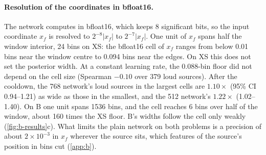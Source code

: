 \paragraph{Resolution of the coordinates in bfloat16.}
The network computes in bfloat16, which keeps 8 significant bits, so the input coordinate
$x_f$ is resolved to $2^{-8}|x_f|$ to $2^{-7}|x_f|$. One unit of $x_f$ spans half the window
interior, 24 bins on XS: the bfloat16 cell of $x_f$ ranges from below 0.01 bins near the
window centre to 0.094 bins near the edges. On XS this does not set the posterior width. At a
constant learning rate, the 0.088-bin floor did not depend on the cell size (Spearman
$-0.10$ over 379 loud sources). After the cooldown, the 768 network's loud sources in the
largest cells are $1.10\times$ (95\% CI 0.94--1.21) as wide as those in the smallest, and
the 512 network's $1.22\times$ (1.02--1.40). On B one unit spans 1536 bins, and the cell
reaches 6 bins over half of the window, about 160 times the XS floor. B's widths follow the cell only weakly (\cref{fig:b-results}c). What limits the plain
network on both problems is a precision of about $2\times10^{-3}$ in $x_f$ wherever the source
sits, which features of the source's position in bins cut (\cref{app:b}).
